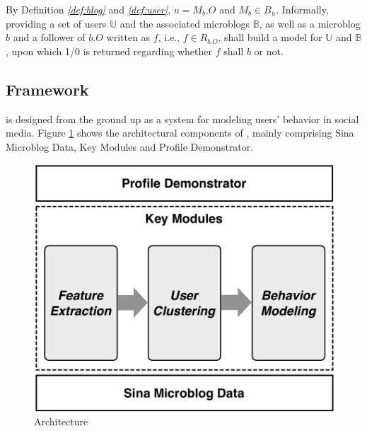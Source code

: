 By Definition \textit{\ref{def:blog}} and \textit{\ref{def:user}}, $u = M_b.O$ and $M_b \in B_u$.
%
Informally, providing a set of users $\mathbb{U}$ and the associated microblogs $\mathbb{B}$, as well as a microblog $b$ and a follower of $b.O$ written as $f$, i.e., $f \in R_{b.O}$, \sys{} shall build a \retg{} model for $\mathbb{U}$ and $\mathbb{B}$, upon which 1/0 is returned regarding whether $f$ shall \ret{} $b$ or not.


\subsection{\sys{} Framework}
\sys{} is designed from the ground up as a system for modeling users' \retg{} behavior in social media.
Figure \ref{fig:framework} shows the architectural components of \sys{}, mainly comprising Sina Microblog Data, Key Modules and Profile Demonstrator.

\begin{figure}[tb!]
\centering
\includegraphics[width=.7\linewidth]{figures/architecture.pdf}
\vspace{-1ex}
\caption{\sys{} Architecture}
\label{fig:framework}
\vspace{-3ex}
\end{figure}

